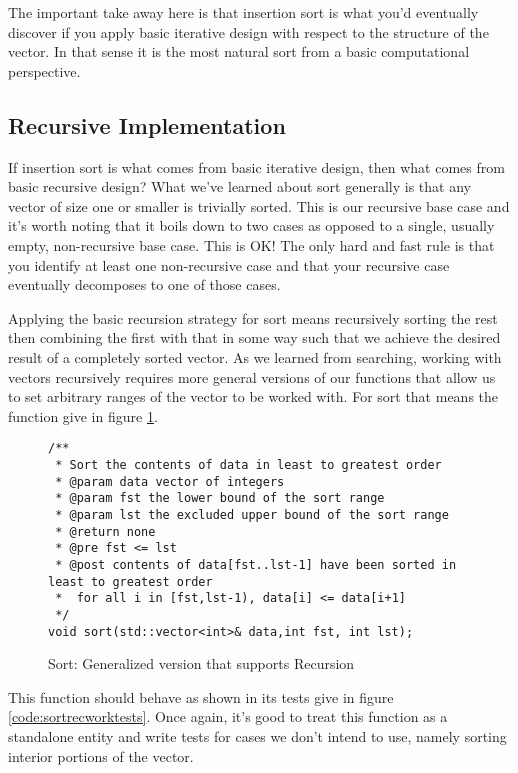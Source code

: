 \documentclass[]{tufte-handout}
\begin{document}
The important take away here is that insertion sort is what you'd eventually discover if you apply basic iterative design with respect to the structure of the vector. In that sense it is the most natural sort from a basic computational perspective. 

\subsection{Recursive Implementation}

If insertion sort is what comes from basic iterative design, then what comes from basic recursive design? What we've learned about sort generally is that any vector of size one or smaller is trivially sorted. This is our recursive base case and it's worth noting that it boils down to two cases as opposed to a single, usually empty, non-recursive base case. This is OK! The only hard and fast rule is that you identify at least one non-recursive case and that your recursive case eventually decomposes to one of those cases.

Applying the basic recursion strategy for sort means recursively sorting the rest then combining the first with that in some way such that we achieve the desired result of a completely sorted vector. As we learned from searching, working with vectors recursively requires more general versions of our functions that allow us to set arbitrary ranges of the vector to be worked with. For sort that means the function give in figure \ref{code:sortrecwork}.

\begin{figure}[!htbp]
\begin{lstlisting}
/**
 * Sort the contents of data in least to greatest order
 * @param data vector of integers
 * @param fst the lower bound of the sort range
 * @param lst the excluded upper bound of the sort range
 * @return none
 * @pre fst <= lst
 * @post contents of data[fst..lst-1] have been sorted in least to greatest order
 *  for all i in [fst,lst-1), data[i] <= data[i+1]
 */
void sort(std::vector<int>& data,int fst, int lst);
\end{lstlisting}
\caption{Sort: Generalized version that supports Recursion}
\label{code:sortrecwork}
\end{figure}

This function should behave as shown in its tests give in figure \ref{code:sortrecworktests}. Once again, it's good to treat this function as a standalone entity and write tests for cases we don't intend to use, namely sorting interior portions of the vector. 
\end{document}
